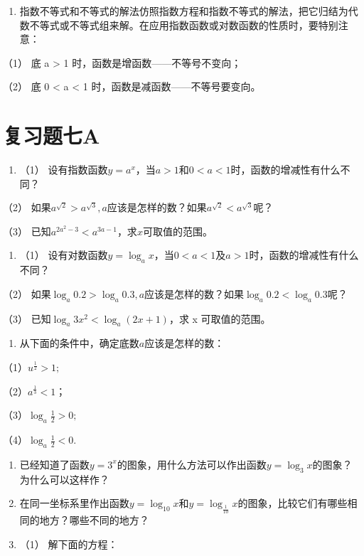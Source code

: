 \begin{enumerate}[start=3]
\item
  指数不等式和不等式的解法仿照指数方程和指数不等式的解法，把它归结为代数不等式或不等式组来解。在应用指数函数或对数函数的性质时，要特别注意：
\end{enumerate}

（1） 底 a \textgreater{} 1 时，函数是增函数------不等号不变向；

（2） 底 0 \textless{} a \textless{} 1
时，函数是减函数------不等号要变向。

\section{复习题七A}

\begin{enumerate}
\item
  （1）
  设有指数函数\(y = a^x\)，当\(a > 1\)和\(0 < a < 1\)时，函数的增减性有什么不同？
\end{enumerate}

（2）
如果\(a^{\sqrt{2}} > a^{\sqrt{3}}, a\)应该是怎样的数？如果\(a^{\sqrt{2}} < a^{\sqrt{3}}\)呢？

（3） 已知\(a^{2a^2 - 3} < a^{3a - 1}\)，求\(x\)可取值的范围。

\begin{enumerate}[start=2]
\item
  （1）
  设有对数函数\(y = \log_a x\)，当\(0 < a < 1\)及\(a > 1\)时，函数的增减性有什么不同？
\end{enumerate}

（2）
如果\(\log_a 0.2 > \log_a 0.3, a\)应该是怎样的数？如果\(\log_a 0.2 < \log_a 0.3\)呢？

（3） 已知\(\log_{a}3x^{2}<\log_{a}(2x+1)\)，求 x 可取值的范围。

\begin{enumerate}[start=3]
\item
  从下面的条件中，确定底数\(a\)应该是怎样的数：
\end{enumerate}

（1）\(u^{\frac{1}{2}} > 1;\)

（2）\(a^{\frac{1}{3}} < 1\)；

（3）\(\log_a\frac{1}{2} > 0;\)

（4）\(\log_a\frac{1}{2} < 0.\)

\begin{enumerate}[start=4]
\item
  已经知道了函数\(y = 3^x\)的图象，用什么方法可以作出函数\(y = \log_3 x\)的图象？为什么可以这样作？
\item
  在同一坐标系里作出函数\(y = \log_{10} x\)和\(y = \log_{\frac{1}{10}} x\)的图象，比较它们有哪些相同的地方？哪些不同的地方？
\item
  （1） 解下面的方程：
\end{enumerate}

